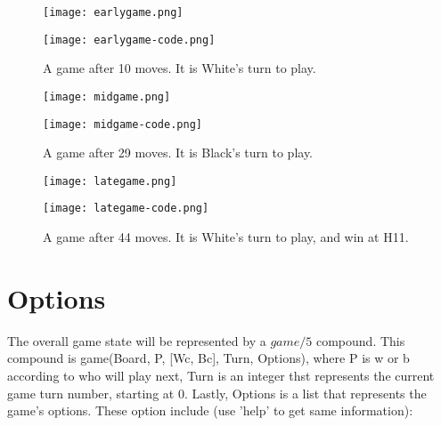 \documentclass[12pt,a4paper,notitlepage]{article}
\begin{document}
\begin{figure}[bhtp]
	\begin{minipage}{0.45\textwidth}
	\texttt{[image: earlygame.png]}
	\end{minipage}
	\begin{minipage}{0.55\textwidth}
		\texttt{[image: earlygame-code.png]}
	\end{minipage}
	\caption{A game after 10 moves. It is White's turn to play.\label{fig:earlygame}}
\end{figure}

\begin{figure}[bhtp]
	\begin{minipage}{0.45\textwidth}
		\texttt{[image: midgame.png]}
	\end{minipage}
	\begin{minipage}{0.55\textwidth}
		\texttt{[image: midgame-code.png]}
	\end{minipage}
	\caption{A game after 29 moves. It is Black's turn to play.\label{fig:midgame}}
\end{figure}

\begin{figure}[bhtp]
	\begin{minipage}{0.45\textwidth}
		\texttt{[image: lategame.png]}
	\end{minipage}
	\begin{minipage}{0.55\textwidth}
		\texttt{[image: lategame-code.png]}
	\end{minipage}
	\caption{A game after 44 moves. It is White's turn to play, and win at H11.\label{fig:lategame}}
\end{figure}

\section{Options}

The overall game state will be represented by a $game/5$ compound. This compound is game(Board, P, [Wc, Bc], Turn, Options), where P is w or b according to who will play next, Turn is an integer thst represents the current game turn number, starting at 0. Lastly, Options is a list that represents the game's options. These option include (use 'help' to get same information): 
\end{document}
